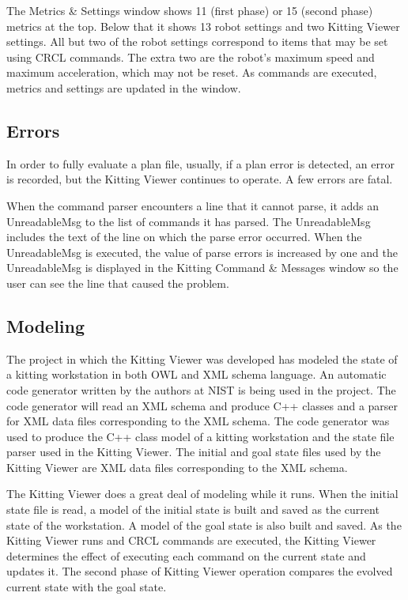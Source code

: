 The Metrics \& Settings window shows 11 (first phase) or 15 (second phase)
metrics at the top. Below that it shows 13 robot settings and two
Kitting Viewer settings. All but two of the robot settings correspond to
items that may be set using CRCL commands. The extra two are the
robot\rq{}s maximum speed and maximum acceleration, which may not be
reset. As commands are executed, metrics and settings are updated in the
window.

\subsection{Errors}
In order to fully evaluate a plan file, usually, if a plan error is
detected, an error is recorded, but the Kitting Viewer continues to operate.
A few errors are fatal.
  
When the command parser encounters a line that it cannot parse, it adds
an \sf UnreadableMsg \rm to the list of commands it has parsed. The \sf
UnreadableMsg \rm includes the text of the line on which the parse error
occurred. When the \sf UnreadableMsg \rm is executed, the value of parse
errors is increased by one and the \sf UnreadableMsg \rm is displayed in
the Kitting Command \& Messages window so the user can see the line that
caused the problem.

\subsection{Modeling}
The project in which the Kitting Viewer was developed has modeled the state
of a kitting workstation in both OWL and XML schema language. An automatic
code generator written by the authors at NIST is being used in the project.
The code generator will read an XML schema and produce C++ classes and a
parser for XML data files corresponding to the XML schema. The code
generator was used to produce the C++ class model of a kitting workstation
and the state file parser used in the Kitting Viewer. The initial and goal
state files used by the Kitting Viewer are XML data files corresponding to
the XML schema.

The Kitting Viewer does a great deal of modeling while it runs. When the
initial state file is read, a model of the initial state is built and saved
as the current state of the workstation. A model of the goal state is also
built and saved. As the Kitting Viewer runs and CRCL commands are executed,
the Kitting Viewer determines the effect of executing each command on the
current state and updates it. The second phase of Kitting Viewer operation
compares the evolved current state with the goal state.

